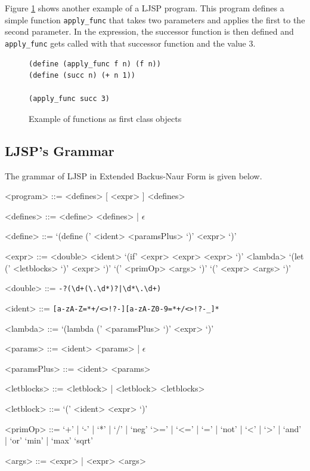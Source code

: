 \documentclass[11pt]{report}
\begin{document}
Figure \ref{ljspexample2} shows another example of a LJSP program. This program defines a simple function \texttt{apply_func} that takes two parameters and applies the first to the second parameter. In the expression, the successor function is then defined and \texttt{apply_func} gets called with that successor function and the value $3$.

\begin{figure}[ht]
\begin{lstlisting}
(define (apply_func f n) (f n))
(define (succ n) (+ n 1))

(apply_func succ 3)
\end{lstlisting}
\caption{Example of functions as first class objects}
\label{ljspexample2}
\end{figure}


\subsection{LJSP's Grammar}
The grammar of LJSP in Extended Backus-Naur Form is given below.

\begin{grammar}
<program> ::= <defines> [ <expr> ] <defines>

<defines> ::= <define> <defines> | $\epsilon$

<define> ::= `(define (' <ident> <paramsPlus> `)' <expr> `)'

<expr> ::= <double>
\alt <ident>
\alt `(if' <expr> <expr> <expr> `)'
\alt <lambda>
\alt `(let (' <letblocks> `)' <expr> `)'
\alt `(' <primOp> <args> `)'
\alt `(' <expr> <args> `)'

<double> ::= \texttt{-?(\textbackslash d+(\textbackslash.\textbackslash d*)?|\textbackslash d*\textbackslash.\textbackslash d+)}

<ident> ::= \texttt{[a-zA-Z=*+/\textless\textgreater!?-][a-zA-Z0-9=*+/\textless\textgreater!?-_]*}

<lambda> ::= `(lambda (' <paramsPlus> `)' <expr> `)'

<params> ::= <ident> <params> | $\epsilon$

<paramsPlus> ::= <ident> <params>

<letblocks> ::= <letblock> | <letblock> <letblocks>

<letblock> ::= `(' <ident> <expr> `)'

<primOp> ::= `+' | `-' | `*' | `/' | `neg'
\alt `>=' | `<=' | `=' | `not' | `<' | `>' | `and' | `or'
\alt `min' | `max'
\alt `sqrt'

<args> ::= <expr> | <expr> <args>
\end{grammar}
\end{document}
